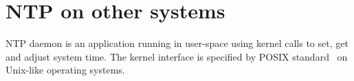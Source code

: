 
\chapter{NTP on other systems}
NTP daemon is an application running in user-space using kernel calls to set, get and
adjust system time.
The kernel interface is specified by POSIX standard~\cite{posix}
on Unix-like operating systems.




